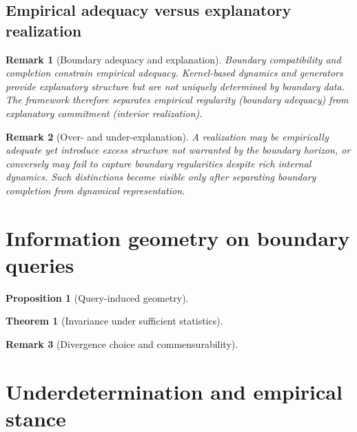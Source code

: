 \documentclass[11pt]{article}
\newtheorem{proposition}{Proposition}
\newtheorem{theorem}{Theorem}
\newtheorem{remark}{Remark}
\begin{document}
\subsection{Empirical adequacy versus explanatory realization}

\begin{remark}[Boundary adequacy and explanation]\label{rem:adequacy-vs-explain}
Boundary compatibility and completion constrain empirical adequacy.
Kernel-based dynamics and generators provide explanatory structure but are not uniquely
determined by boundary data. The framework therefore separates empirical regularity
(boundary adequacy) from explanatory commitment (interior realization).
\end{remark}

\begin{remark}[Over- and under-explanation]
A realization may be empirically adequate yet introduce excess structure not warranted by the
boundary horizon, or conversely may fail to capture boundary regularities despite rich internal
dynamics. Such distinctions become visible only after separating boundary completion from
dynamical representation.
\end{remark}



\section{Information geometry on boundary queries}

\begin{proposition}[Query-induced geometry]\label{prop:query-geometry}
\end{proposition}

\begin{theorem}[Invariance under sufficient statistics]\label{thm:cencov-invariance}
\end{theorem}

\begin{remark}[Divergence choice and commensurability]\label{rem:divergence-choice}
\end{remark}




\section{Underdetermination and empirical stance}
\end{document}
